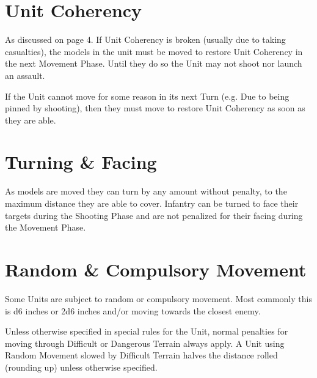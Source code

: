 \section{Unit Coherency}
As discussed on page 4. If Unit Coherency is broken (usually due
to taking casualties), the models in the unit must be moved to
restore Unit Coherency in the next Movement Phase. Until they do
so the Unit may not shoot nor launch an assault.

If the Unit cannot move for some reason in its next Turn (e.g. Due
to being pinned by shooting), then they must move to restore Unit
Coherency as soon as they are able.

\section{Turning \& Facing}
As models are moved they can turn by any amount without
penalty, to the maximum distance they are able to cover. Infantry
can be turned to face their targets during the Shooting Phase and
are not penalized for their facing during the Movement Phase.

\section{Random \& Compulsory Movement}
Some Units are subject to random or compulsory movement. Most
commonly this is d6 inches or 2d6 inches and/or moving towards
the closest enemy.

Unless otherwise specified in special rules for the Unit, normal
penalties for moving through Difficult or Dangerous Terrain
always apply. A Unit using Random Movement slowed by Difficult
Terrain halves the distance rolled (rounding up) unless otherwise
specified.